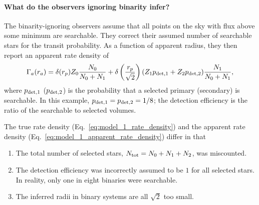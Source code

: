 \paragraph{What do the observers ignoring binarity infer?} 
The binarity-ignoring observers assume that all points on the sky with flux 
above some minimum are searchable.
They correct their assumed number of searchable stars for the transit 
probability.
As a function of apparent radius, they then report an apparent rate density of
\begin{equation}
\Gamma_a(r_a) = 
\delta(r_p) Z_0 \frac{N_0}{N_0+N_1}  +
\delta\left(\frac{r_p}{\sqrt{2}}\right) 
(Z_1 p_{{\rm det},1} + Z_2 p_{{\rm det},2}) \frac{N_1}{N_0+N_1},
\label{eq:model_1_apparent_rate_density}
\end{equation}
where $p_{{\rm det},1}$ ($p_{{\rm det},2}$) is the probability that a selected 
primary (secondary) is searchable.
In this example, $p_{{\rm det},1}=p_{{\rm det},2}=1/8$; the detection 
efficiency is the ratio of the searchable to selected volumes.

The true rate density (Eq.~\ref{eq:model_1_rate_density}) and the
apparent rate density (Eq.~\ref{eq:model_1_apparent_rate_density})
differ in that
\begin{enumerate}
\item The total number of selected stars, $N_{\rm tot} = N_0+N_1+N_2$, was 
miscounted.
%
\item The detection efficiency was incorrectly assumed to be $1$ for all 
selected stars. In reality, only one in eight binaries were searchable.
%
\item The inferred radii in binary systems are all $\sqrt{2}$ too small.
\end{enumerate}


